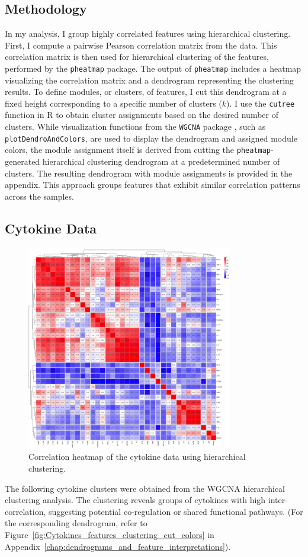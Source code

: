 \documentclass[12pt,a4paper]{report}
\begin{document}
\subsection{Methodology}
\noindent
In my analysis, I group highly correlated features using hierarchical clustering. First, I compute a pairwise Pearson correlation matrix from the data. This correlation matrix is then used for hierarchical clustering of the features, performed by the \texttt{pheatmap} package. The output of \texttt{pheatmap} includes a heatmap visualizing the correlation matrix and a dendrogram representing the clustering results. To define modules, or clusters, of features, I cut this dendrogram at a fixed height corresponding to a specific number of clusters ($k$). I use the \texttt{cutree} function in R to obtain cluster assignments based on the desired number of clusters. While visualization functions from the \texttt{WGCNA} package \cite{WGCNA}, such as \texttt{plotDendroAndColors}, are used to display the dendrogram and assigned module colors, the module assignment itself is derived from cutting the \texttt{pheatmap}-generated hierarchical clustering dendrogram at a predetermined number of clusters. The resulting dendrogram with module assignments is provided in the appendix. This approach groups features that exhibit similar correlation patterns across the samples.

\subsection{Cytokine Data}
\begin{figure}[h!]
  \centering
  \includegraphics[width=0.8\textwidth]{images/Cytokine_euclidean_distance.png}
  \caption[cytokines data correlations]{Correlation heatmap of the cytokine data using hierarchical clustering.}
  \label{fig:cytokine_heatmap}
\end{figure}
\noindent
The following cytokine clusters were obtained from the WGCNA hierarchical clustering analysis. The clustering reveals groups of cytokines with high inter-correlation, suggesting potential co-regulation or shared functional pathways. (For the corresponding dendrogram, refer to Figure~\ref{fig:Cytokines_features_clustering_cut_colors} in Appendix~\ref{chap:dendrograms_and_feature_interpretations}).
\end{document}

